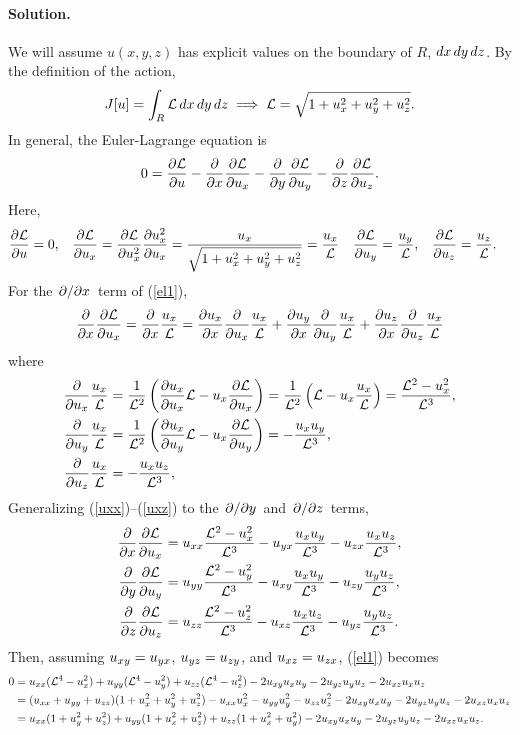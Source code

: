 \documentclass[11pt]{article}
\newcommand{\refeq}[1]{(\ref{#1})}
\newcommand{\beq}{\begin{equation*}}
\newcommand{\eeq}{\end{equation*}}
\newcommand{\beqn}{\begin{equation}}
\newcommand{\eeqn}{\end{equation}}
\newenvironment{solution}
{
    \paragraph{Solution.}
    \ignorespaces
}
{
}
\begin{document}
\begin{solution}
	We will assume $u(x, y, z)$ has explicit values on the boundary of $R$, $\dd{x} \dd{y} \dd{z}$.  By the definition of the action,
	\beq
		J[u] = \intr \Ld \dr \implies \Ld = \sqrt{1 + \ux^2 + \uy^2 + \uz^2}.
	\eeq
	In general, the Euler-Lagrange equation is
	\beqn \label{el1}
		0 = \pdv{\Ld}{u} - \pdv{}{x} \pdv{\Ld}{\ux} - \pdv{}{y} \pdv{\Ld}{\uy} - \pdv{}{z} \pdv{\Ld}{\uz}.
	\eeqn
	Here,
	\begin{align*}
		\pdv{\mathcal{L}}{u} &= 0, &
		\pdv{\mathcal{L}}{u_x} &= \pdv{\mathcal{L}}{u_x^2} \pdv{u_x^2}{u_x} = \frac{u_x}{\sqrt{1 + u_x^2 + u_y^2 + u_z^2}} = \frac{u_x}{\mathcal{L}} &
		\pdv{\mathcal{L}}{u_y} &= \frac{u_y}{\mathcal{L}}, &
		\pdv{\mathcal{L}}{u_z} &= \frac{u_z}{\mathcal{L}}.
	\end{align*}
	For the $\pdv*{}{x}$ term of \refeq{el1},
	\beq
		\pdv{}{x} \pdv{\Ld}{\ux} = \pdv{}{x} \frac{\ux}{\Ld} = \pdv{\ux}{x} \pdv{}{\ux} \frac{\ux}{\Ld} + \pdv{\uy}{x} \pdv{}{\uy} \frac{\ux}{\Ld} + \pdv{\uz}{x} \pdv{}{\uz} \frac{\ux}{\Ld}
	\eeq
	where
	\begin{align}
		\pdv{}{u_x} \frac{u_x}{\mathcal{L}} &= \frac{1}{\mathcal{L}^2} \left(\pdv{u_x}{u_x} \mathcal{L} - u_x \pdv{\mathcal{L}}{u_x} \right) = \frac{1}{\mathcal{L}^2} \left( \mathcal{L} - u_x \frac{u_x}{\mathcal{L}} \right) = \frac{\mathcal{L}^2 - u_x^2}{\mathcal{L}^3}, \label{uxx} \\
		\pdv{}{u_y} \frac{u_x}{\mathcal{L}} &= \frac{1}{\mathcal{L}^2} \left(\pdv{u_x}{u_y} \mathcal{L} - u_x \pdv{\mathcal{L}}{u_y} \right) = -\frac{u_x u_y}{\mathcal{L}^3}, \\
		\pdv{}{u_z} \frac{u_x}{\mathcal{L}} &= -\frac{u_x u_z}{\mathcal{L}^3}, \label{uxz}
	\end{align}
	Generalizing \refeq{uxx}--\refeq{uxz} to the $\pdv*{}{y}$ and $\pdv*{}{z}$ terms,
	\begin{align*}
		\pdv{}{x} \pdv{\mathcal{L}}{u_x} &= u_{xx} \frac{\mathcal{L}^2 - u_x^2}{\mathcal{L}^3} - u_{yx} \frac{u_x u_y}{\mathcal{L}^3} - u_{zx} \frac{u_x u_z}{\mathcal{L}^3}, \\
		\pdv{}{y} \pdv{\mathcal{L}}{u_y} &= u_{yy} \frac{\mathcal{L}^2 - u_y^2}{\mathcal{L}^3} - u_{xy} \frac{u_x u_y}{\mathcal{L}^3} - u_{zy} \frac{u_y u_z}{\mathcal{L}^3}, \\
		\pdv{}{z} \pdv{\mathcal{L}}{u_z} &= u_{zz} \frac{\mathcal{L}^2 - u_z^2}{\mathcal{L}^3} - u_{xz} \frac{u_x u_z}{\mathcal{L}^3} - u_{yz} \frac{u_y u_z}{\mathcal{L}^3}.
	\end{align*}
	Then, assuming $u_{xy} = u_{yx}$, $u_{yz} = u_{zy}$, and $u_{xz} = u_{zx}$, \refeq{el1} becomes
	\begin{align*}
		0 &= u_{xx} (\mathcal{L}^4 - u_x^2) + u_{yy} (\mathcal{L}^4 - u_y^2) + u_{zz} (\mathcal{L}^4 - u_z^2) - 2 u_{xy} u_x u_y - 2 u_{yz} u_y u_z - 2 u_{xz} u_x u_z \\
		&= (u_{xx} + u_{yy} + u_{zz}) (1 + u_x^2 + u_y^2 + u_z^2) - u_{xx} u_x^2 - u_{yy} u_y^2 - u_{zz} u_z^2 - 2 u_{xy} u_x u_y - 2 u_{yz} u_y u_z - 2 u_{xz} u_x u_z \\
		&= u_{xx} (1 + u_y^2 + u_z^2) + u_{yy} (1 + u_x^2 + u_z^2) + u_{zz}(1 + u_x^2 + u_y^2) - 2 u_{xy} u_x u_y - 2 u_{yz} u_y u_z - 2 u_{xz} u_x u_z.
	\end{align*}
\end{solution}
\end{document}
